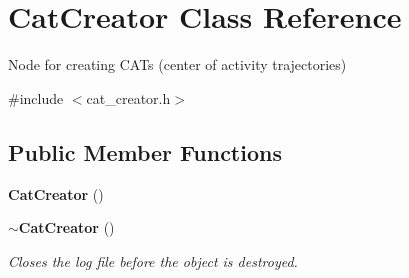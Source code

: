 \section{\-Cat\-Creator \-Class \-Reference}
\label{classCatCreator}


\-Node for creating \-C\-A\-Ts (center of activity trajectories)  




{\ttfamily \#include $<$cat\-\_\-creator.\-h$>$}

\subsection*{\-Public \-Member \-Functions}
\begin{DoxyCompactItemize}
\item 
{\bf \-Cat\-Creator} ()
\item 
{\bf $\sim$\-Cat\-Creator} ()
\begin{DoxyCompactList}\small\item\em \-Closes the log file before the object is destroyed. \end{DoxyCompactList}\end{DoxyCompactItemize}
